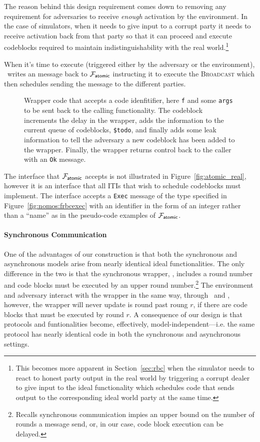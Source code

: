 The reason behind this design requirement comes down to removing any requirement for adversaries to receive \textit{enough} activation by the environment.
In the case of simulators, when it needs to give input to a corrupt party it needs to receive activation back from that party so that it can proceed and execute codeblocks required to maintain indistinguishability with the real world.\footnote{This becomes more apparent in Section~\ref{sec:rbc} when the simulator needs to react to honest party output in the real world by triggering a corrupt dealer to give input to the ideal functionality which schedules code that sends output to the corresponding ideal world party at the same time.}

When it's time to execute (triggered either by the adversary or the environment), \Wasync~writes an \Exec message back to $\mathcal{F}_{{\mathsf {atomic}}}$ instructing it to execute the \textsc{Broadcast} which then schedules sending the message to the different parties. 

\begin{figure}[!ht]

\caption{Wrapper code that accepts a code idenfitifier, here \texttt{f} and some \texttt{args} to be sent back to the calling functionality. The codeblock increments the delay in the wrapper, adds the information to the current queue of codeblocks, \texttt{\$todo}, and finally adds some leak information to tell the adversary a new codeblock has been added to the wrapper. Finally, the wrapper returns control back to the caller with an \texttt{Ok} message.}
\label{fig:wrapper:schedule}
\end{figure}

The \Exec interface that $\mathcal{F}_{{\mathsf {atomic}}}$ accepts is not illustrated in Figure~\ref{fig:atomic_real}, however it is an interface that all ITIs that wish to schedule codeblocks must implement.
The interface accepts a \texttt{Exec} message of the type specified in Figure~\ref{fig:nomos:frbcexec} with an identifier in the form of an integer rather than a ``name'' as in the pseudo-code examples of $\mathcal{F}_{{\mathsf {atomic}}}$.

\paragraph{Synchronous Communication}
One of the advantages of our construction is that both the synchronous and asynchronous models arise from nearly identical ideal functionalities.
The only difference in the two is that the synchronous wrapper, \Wsync, includes a round number and code blocks must be executed by an upper round number.\footnote{Recalls synchronous communication impies an upper bound on the number of rounds a message send, or, in our case, code block execution can be delayed.}
The environment and adversary interact with the wrapper in the same way, through \Advance~and \Exec, however, the wrapper will never update is round past roung $r$, if there are code blocks that must be executed by round $r$.
A consequence of our design is that protocols and funtionalities become, effectively, model-independent---i.e. the same protocol has nearly identical code in both the synchronous and asynchronous settings.

